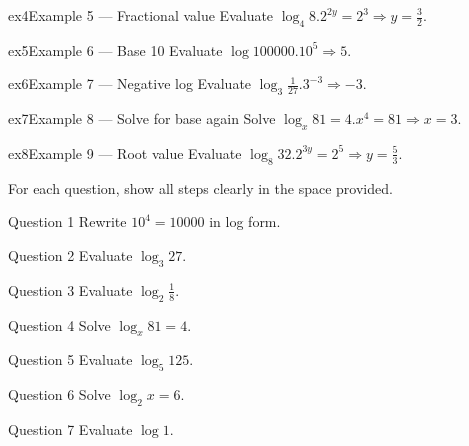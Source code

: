 \documentclass[11pt]{article}
\begin{document}
\begin{example}{ex4}{Example 5 --- Fractional value}
Evaluate $\log_4 8$.\soln $2^{2y}=2^3\Rightarrow y=\tfrac32$.
\end{example}

\begin{example}{ex5}{Example 6 --- Base 10}
Evaluate $\log 100000$.\soln $10^5\Rightarrow 5$.
\end{example}

\begin{example}{ex6}{Example 7 --- Negative log}
Evaluate $\log_3\tfrac{1}{27}$.\soln $3^{-3}\Rightarrow -3$.
\end{example}

\begin{example}{ex7}{Example 8 --- Solve for base again}
Solve $\log_x 81=4$.\soln $x^4=81\Rightarrow x=3$.
\end{example}

\begin{example}{ex8}{Example 9 --- Root value}
Evaluate $\log_8 32$.\soln $2^{3y}=2^5\Rightarrow y=\tfrac53$.
\end{example}

\clearpage
{}
For each question, show all steps clearly in the space provided.

\begin{qbox}{Question 1}
Rewrite $10^4=10000$ in log form.\workspace{2.4cm}
\end{qbox}

\begin{qbox}{Question 2}
Evaluate $\log_3 27$.\workspace{2.4cm}
\end{qbox}

\begin{qbox}{Question 3}
Evaluate $\log_2\tfrac18$.\workspace{2.4cm}
\end{qbox}

\begin{qbox}{Question 4}
Solve $\log_x 81=4$.\workspace{2.4cm}
\end{qbox}

\begin{qbox}{Question 5}
Evaluate $\log_5 125$.\workspace{2.4cm}
\end{qbox}

\begin{qbox}{Question 6}
Solve $\log_2 x=6$.\workspace{2.4cm}
\end{qbox}

\begin{qbox}{Question 7}
Evaluate $\log 1$.\workspace{2.4cm}
\end{qbox}
\end{document}
